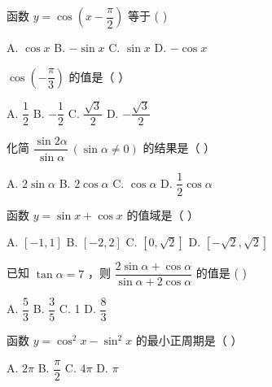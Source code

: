 \documentclass[11pt, a4paper]{article}
\begin{document}

\begin{baitap}[1]
函数 $y = \cos\!\left(x - \dfrac{\pi}{2}\right)$ 等于 ( )
\par\vspace{3pt}
\noindent A. $\cos x$ \quad B. $-\sin x$ \quad C. $\sin x$ \quad D. $-\cos x$
\end{baitap}

\begin{baitap}[2]
$\cos\!\left(-\dfrac{\pi}{3}\right)$ 的值是（ ）
\par\vspace{3pt}
\noindent A. $\dfrac{1}{2}$ \quad B. $-\dfrac{1}{2}$ \quad C. $\dfrac{\sqrt{3}}{2}$ \quad D. $-\dfrac{\sqrt{3}}{2}$
\end{baitap}

\begin{baitap}[3]
化简 $\dfrac{\sin 2\alpha}{\sin\alpha}\ (\sin\alpha \neq 0)$ 的结果是（ ）
\par\vspace{3pt}
\noindent A. $2\sin\alpha$ \quad B. $2\cos\alpha$ \quad C. $\cos\alpha$ \quad D. $\dfrac{1}{2}\cos\alpha$
\end{baitap}

\begin{baitap}[4]
函数 $y = \sin x + \cos x$ 的值域是（ ）
\par\vspace{3pt}
\noindent A. $[-1,1]$ \quad B. $[-2,2]$ \quad C. $[0,\sqrt{2}]$ \quad D. $[-\sqrt{2}, \sqrt{2}]$
\end{baitap}

\begin{baitap}[5]
已知 $\tan\alpha = 7$ ，则 $\dfrac{2\sin\alpha + \cos\alpha}{\sin\alpha + 2\cos\alpha}$ 的值是 ( )
\par\vspace{3pt}
\noindent A. $\dfrac{5}{3}$ \quad B. $\dfrac{3}{5}$ \quad C. 1 \quad D. $\dfrac{8}{3}$
\end{baitap}

\begin{baitap}[6]
函数 $y = \cos^2 x - \sin^2 x$ 的最小正周期是（ ）
\par\vspace{3pt}
\noindent A. $2\pi$ \quad B. $\dfrac{\pi}{2}$ \quad C. $4\pi$ \quad D. $\pi$
\end{baitap}
\end{document}
